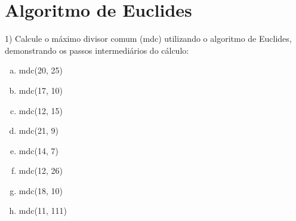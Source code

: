 \section*{Algoritmo de Euclides}

1) Calcule o máximo divisor comum (mdc) utilizando o algoritmo
de Euclides, demonstrando os passos intermediários do cálculo:

\begin{enumerate}[(a)]
\item mdc(20, 25)
\item mdc(17, 10)
\item mdc(12, 15)
\item mdc(21, 9)
\item mdc(14, 7)
\item mdc(12, 26)
\item mdc(18, 10)
\item mdc(11, 111)
\end{enumerate}

